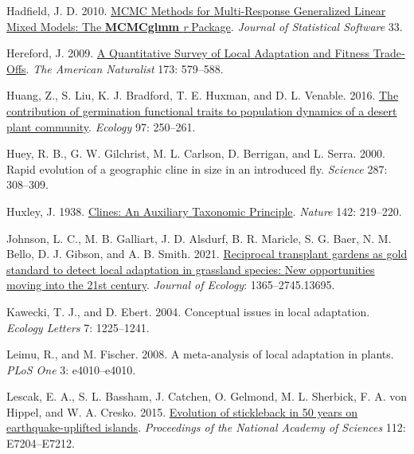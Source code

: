 \documentclass[
  12pt,
]{article}
\newlength{\cslhangindent}
\newlength{\cslentryspacingunit} %
\newenvironment{CSLReferences}[2] %
 {%
  \setlength{\parindent}{0pt}
  \ifodd #1
  \let\oldpar\par
  \def\par{\hangindent=\cslhangindent\oldpar}
  \fi
  \setlength{\parskip}{#2\cslentryspacingunit}
 }%
 {}
\begin{document}
\begin{CSLReferences}{1}{0}
\leavevmode{}%
Hadfield, J. D. 2010. \href{https://doi.org/10.18637/jss.v033.i02}{{MCMC} {Methods} for {Multi}-{Response} {Generalized} {Linear} {Mixed} {Models}: {The} \textbf{MCMCglmm} \emph{r} {Package}}. \emph{Journal of Statistical Software} 33.

\leavevmode{}%
Hereford, J. 2009. \href{https://doi.org/10.1086/597611}{A {Quantitative} {Survey} of {Local} {Adaptation} and {Fitness} {Trade}‐{Offs}}. \emph{The American Naturalist} 173: 579--588.

\leavevmode{}%
Huang, Z., S. Liu, K. J. Bradford, T. E. Huxman, and D. L. Venable. 2016. \href{https://doi.org/10.1890/15-0744.1}{The contribution of germination functional traits to population dynamics of a desert plant community}. \emph{Ecology} 97: 250--261.

\leavevmode{}%
Huey, R. B., G. W. Gilchrist, M. L. Carlson, D. Berrigan, and L. Serra. 2000. Rapid evolution of a geographic cline in size in an introduced fly. \emph{Science} 287: 308--309.

\leavevmode{}%
Huxley, J. 1938. \href{https://doi.org/10.1038/142219a0}{Clines: An {Auxiliary} {Taxonomic} {Principle}}. \emph{Nature} 142: 219--220.

\leavevmode{}%
Johnson, L. C., M. B. Galliart, J. D. Alsdurf, B. R. Maricle, S. G. Baer, N. M. Bello, D. J. Gibson, and A. B. Smith. 2021. \href{https://doi.org/10.1111/1365-2745.13695}{Reciprocal transplant gardens as gold standard to detect local adaptation in grassland species: {New} opportunities moving into the 21st century}. \emph{Journal of Ecology}: 1365--2745.13695.

\leavevmode{}%
Kawecki, T. J., and D. Ebert. 2004. Conceptual issues in local adaptation. \emph{Ecology Letters} 7: 1225--1241.

\leavevmode{}%
Leimu, R., and M. Fischer. 2008. A meta-analysis of local adaptation in plants. \emph{PLoS One} 3: e4010--e4010.

\leavevmode{}%
Lescak, E. A., S. L. Bassham, J. Catchen, O. Gelmond, M. L. Sherbick, F. A. von Hippel, and W. A. Cresko. 2015. \href{https://doi.org/10.1073/pnas.1512020112}{Evolution of stickleback in 50 years on earthquake-uplifted islands}. \emph{Proceedings of the National Academy of Sciences} 112: E7204--E7212.


\end{CSLReferences}
\end{document}
